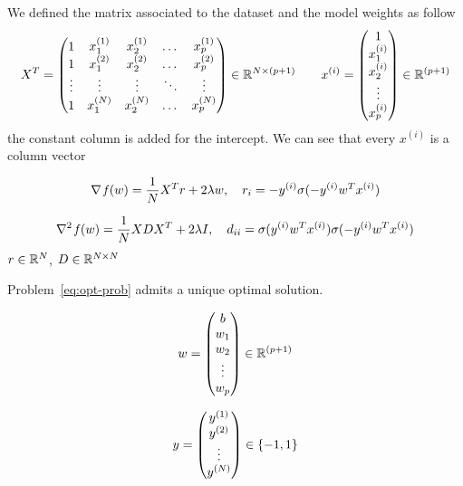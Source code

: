 We defined the matrix associated to the dataset and the model weights as follow
\[
X^T=
\begin{pmatrix}
1 & x_1^{(1)} & x_2^{(1)} & \dots & x_p^{(1)} \\
1 & x_1^{(2)} & x_2^{(2)} & \dots & x_p^{(2)} \\
\vdots & \vdots & \vdots & \ddots & \vdots \\
1 & x_1^{(N)} & x_2^{(N)} & \dots & x_p^{(N)}
\end{pmatrix}\in\mathbb{R}^{N\times(p+1)}\qquad
x^{(i)}=
\begin{pmatrix}
1 \\ x_1^{(i)} \\ x_2^{(i)} \\ \vdots \\ x_p^{(i)}
\end{pmatrix}\in\mathbb{R}^{(p+1)}
\]
the constant column is added for the intercept. We can see that every $x^{(i)}$ is a column vector

\[
\nabla\operatorname*{\mathit{f}}(w)=\frac{1}{N}X^Tr+2\lambda w,\quad r_i=-y^{(i)}\sigma(-y^{(i)}w^Tx^{(i)})
\]

\[
\nabla^2\operatorname*{\mathit{f}}(w)=\frac{1}{N}XDX^T+2\lambda I,\quad d_{ii}=\sigma(y^{(i)}w^Tx^{(i)})\sigma(-y^{(i)}w^Tx^{(i)})
\]
$r\in\mathbb{R}^N$, $D\in\mathbb{R}^{N\times N}$

\begin{prop}
Problem~\eqref{eq:opt-prob} admits a unique optimal solution.
\end{prop}



\[
w=
\begin{pmatrix}
b \\ w_1 \\ w_2 \\ \vdots \\ w_p
\end{pmatrix}\in\mathbb{R}^{(p+1)}
\]

\[
y=
\begin{pmatrix}
y^{(1)} \\ y^{(2)} \\ \vdots \\ y^{(N)}
\end{pmatrix}\in\{-1,1\}
\]

\cleardoublepage


